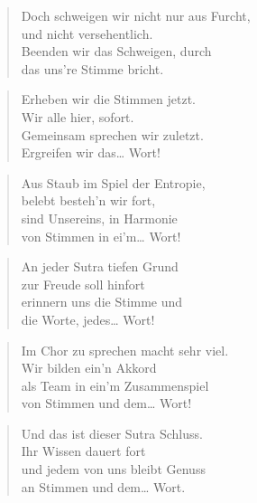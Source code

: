 \documentclass[10pt,a4paper]{article}
\begin{document}
\begin{paracol}{2}
\begin{verse}
Doch schweigen wir nicht nur aus Furcht, \\
und nicht versehentlich. \\
Beenden wir das Schweigen, durch \\
das uns’re Stimme bricht. \\
\end{verse}

\begin{verse}
Erheben wir die Stimmen jetzt. \\
Wir alle hier, sofort. \\
Gemeinsam sprechen wir zuletzt. \\
Ergreifen wir das… Wort! \\
\end{verse}

\begin{verse}
Aus Staub im Spiel der Entropie, \\
belebt besteh’n wir fort, \\
sind Unsereins, in Harmonie \\
von Stimmen in ei’m… Wort! \\
\end{verse}

\begin{verse}
An jeder Sutra tiefen Grund \\
zur Freude soll hinfort \\
erinnern uns die Stimme und \\
die Worte, jedes… Wort! \\
\end{verse}

\begin{verse}
Im Chor zu sprechen macht sehr viel. \\
Wir bilden ein’n Akkord \\
als Team in ein’m Zusammenspiel \\
von Stimmen und dem… Wort! \\
\end{verse}

\begin{verse}
Und das ist dieser Sutra Schluss. \\
Ihr Wissen dauert fort \\
und jedem von uns bleibt Genuss \\
an Stimmen und dem… Wort. \\
\end{verse}

\end{paracol}
\end{document}
